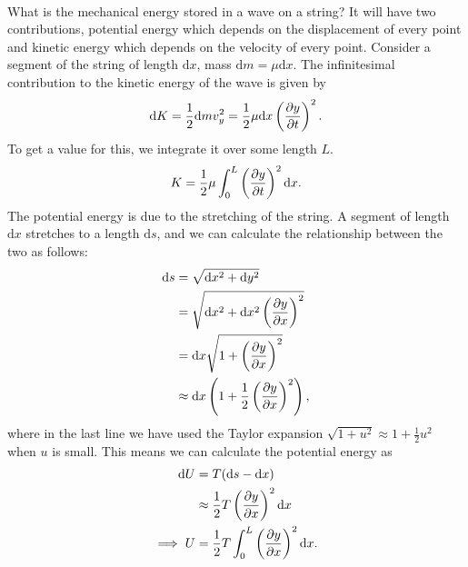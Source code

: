 \documentclass[../classical_mechanics.tex]{subfiles}
\begin{document}
        \paragraph{}
        What is the mechanical energy stored in a wave on a string?
        It will have two contributions, potential energy which depends on the displacement of every point and kinetic energy which depends on the velocity of every point.
        Consider a segment of the string of length $\mathrm{d}x$, mass $\mathrm{d}m=\mu\mathrm{d}x$.
        The infinitesimal contribution to the kinetic energy of the wave is given by
        \begin{equation}
            \mathrm{d}K=\frac{1}{2}\mathrm{d}mv_y^2=\frac{1}{2}\mu\mathrm{d}x\left(\pdv{y}{t}\right)^2.
        \end{equation}
        To get a value for this, we integrate it over some length $L$.
        \begin{equation}
            K=\frac{1}{2}\mu\int_{0}^{L}\left(\pdv{y}{t}\right)^2\mathrm{d}x.
        \end{equation}
        The potential energy is due to the stretching of the string.
        A segment of length $\mathrm{d}x$ stretches to a length $\mathrm{d}s$, and we can calculate the relationship between the two as follows:
        \begin{align}
            \mathrm{d}s&=\sqrt{\mathrm{d}x^2+\mathrm{d}y^2}\\
            &=\sqrt{\mathrm{d}x^2+\mathrm{d}x^2\left(\pdv{y}{x}\right)^2}\\
            &=\mathrm{d}x\sqrt{1+\left(\pdv{y}{x}\right)^2}\\
            &\approx\mathrm{d}x\left(1+\frac{1}{2}\left(\pdv{y}{x}\right)^2\right),
        \end{align}
        where in the last line we have used the Taylor expansion $\sqrt{1+u^2}\approx 1+\frac{1}{2}u^2$ when $u$ is small.
        This means we can calculate the potential energy as
        \begin{align}
            \mathrm{d}U&=T(\mathrm{d}s-\mathrm{d}x)\\
            &\approx\frac{1}{2}T\left(\pdv{y}{x}\right)^2\mathrm{d}x\\
            \implies U&=\frac{1}{2}T\int_{0}^{L}\left(\pdv{y}{x}\right)^2\mathrm{d}x.
        \end{align}
\end{document}
